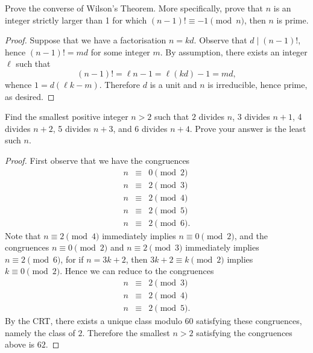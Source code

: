 \documentclass[10pt]{amsart}
\begin{document}
\begin{thm}\label{ex1}
  Prove the converse of Wilson's Theorem.
  More specifically, prove that $n$ is an integer strictly larger than 1 for which $(n-1)! \equiv -1 \pmod{n}$, then $n$ is prime.
  
  \begin{proof}
    Suppose that we have a factorisation $n = kd$.
    Observe that $d \mid (n-1)!$, hence $(n-1)! = md$ for some integer $m$.
    By assumption, there exists an integer $\ell$ such that
    $$(n-1)! = \ell n - 1 = \ell(kd) - 1 = md,$$
    whence $1 = d(\ell k - m)$.
    Therefore $d$ is a unit and $n$ is irreducible, hence prime, as desired.
  \end{proof}
\end{thm}

\begin{thm}
	Find the smallest positive integer $n > 2$ such that $2$ divides $n$, $3$ divides $n + 1$, 4 divides $n + 2$, 5 divides $n + 3$, and $6$ divides $n + 4$.
	Prove your answer is the least such $n$.

	\begin{proof}
		First observe that we have the congruences
		\begin{eqnarray*}
			n & \equiv &  0 \pmod{2}\\
			n & \equiv & 2 \pmod{3}\\
			n & \equiv & 2 \pmod{4}\\
			n & \equiv & 2 \pmod{5}\\
			n & \equiv & 2 \pmod{6}.
		\end{eqnarray*}
		Note that $n \equiv 2 \pmod{4}$ immediately implies $n \equiv 0 \pmod{2}$, and the congruences $n \equiv 0 \pmod{2}$ and $n \equiv 2 \pmod{3}$ immediately implies $n \equiv 2 \pmod{6}$, for if $n = 3k + 2$, then $3k + 2\equiv k \pmod{2}$ implies $k \equiv 0 \pmod{2}$.
		Hence we can reduce to the congruences
		\begin{eqnarray*}
			n &\equiv& 2 \pmod{3}\\
			n &\equiv& 2 \pmod{4}\\
			n &\equiv& 2 \pmod{5}.
		\end{eqnarray*}
		By the CRT, there exists a unique class modulo 60 satisfying these congruences, namely the class of $2$.
		Therefore the smallest $n > 2$ satisfying the congruences above is $62$.
	\end{proof}	 
\end{thm}
\end{document}
